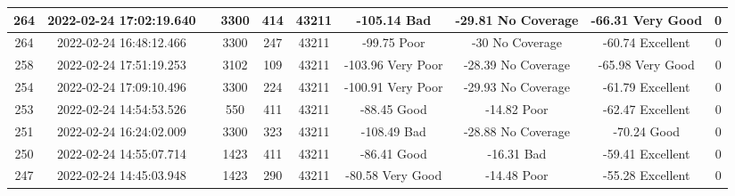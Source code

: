 \begin{longtable*}{|c|c|c|c|c|c|c|c|c|c|}
264&2022-02-24 17:02:19.640&&3300&414&43211& -105.14   Bad         & -29.81    No Coverage & -66.31    Very Good   & 0\\\hline
{}264&2022-02-24 16:48:12.466&&3300&247&43211& -99.75    Poor        & -30       No Coverage & -60.74    Excellent   & 0\\\hline
{}258&2022-02-24 17:51:19.253&&3102&109&43211& -103.96   Very Poor   & -28.39    No Coverage & -65.98    Very Good   & 0\\\hline
{}254&2022-02-24 17:09:10.496&&3300&224&43211& -100.91   Very Poor   & -29.93    No Coverage & -61.79    Excellent   & 0\\\hline
{}253&2022-02-24 14:54:53.526&&550&411&43211& -88.45    Good        & -14.82    Poor        & -62.47    Excellent   & 0\\\hline
{}251&2022-02-24 16:24:02.009&&3300&323&43211& -108.49   Bad         & -28.88    No Coverage & -70.24    Good        & 0\\\hline
{}250&2022-02-24 14:55:07.714&&1423&411&43211& -86.41    Good        & -16.31    Bad         & -59.41    Excellent   & 0\\\hline
{}247&2022-02-24 14:45:03.948&&1423&290&43211& -80.58    Very Good   & -14.48    Poor        & -55.28    Excellent   & 0\\\hline

\end{longtable*}
